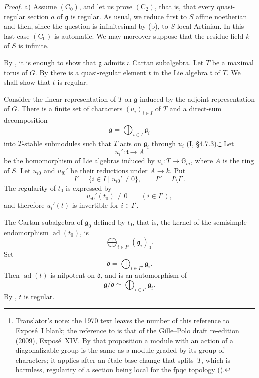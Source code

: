 \smallskip
\noindent
\emph{Proof.}
\textup{a)}
Assume \((\mathrm C_0)\), and let us prove \((\mathrm C_2)\), that
is, that every quasi-regular section \(a\) of \(\mathfrak g\) is
regular. As usual, we reduce first to \(S\) affine noetherian and
then, since the question is infinitesimal by \textup{(b)}, to
\(S\) local Artinian. In this last case \((\mathrm C_0)\) is
automatic. We may moreover suppose that the residue field \(k\)
of \(S\) is infinite.

By , it is enough to show that \(\mathfrak g\) admits a Cartan
subalgebra. Let \(T\) be a maximal torus of \(G\). By  there is
a quasi-regular element \(t\) in the Lie algebra \(\mathfrak t\)
of \(T\). We shall show that \(t\) is regular.

Consider the linear representation of \(T\) on \(\mathfrak g\)
induced by the adjoint representation of \(G\). There is a finite
set of characters \((u_i)_{i\in I}\) of \(T\) and a direct-sum
decomposition
\[
  \mathfrak g=\bigoplus_{i\in I}\mathfrak g_i
\]
into \(T\)-stable submodules such that \(T\) acts on
\(\mathfrak g_i\) through \(u_i\)
\textup{(I, \S4.7.3)}.\footnote{Translator's note: the 1970 text leaves the number of this reference to Exposé~I blank; the reference to  is that of the Gille--Polo draft re-edition (2009), Exposé~XIV. By that proposition a module with an action of a diagonalizable group is the same as a module graded by its group of characters; it applies after an étale base change that splits~\(T\), which is harmless, regularity of a section being local for the fpqc topology \textup{()}.} Let
\[
  u_i'\colon\mathfrak t\longrightarrow A
\]
be the homomorphism of Lie algebras induced by
\(u_i\colon T\to\mathbb G_m\), where \(A\) is the ring of \(S\).
Let \(u_{i0}\) and \(u_{i0}'\) be their reductions under
\(A\to k\). Put
\[
  I'=\{i\in I\mid u_{i0}'\ne0\},
  \qquad I''=I\setminus I'.
\]
The regularity of \(t_0\) is expressed by
\[
  u_{i0}'(t_0)\ne0\qquad(i\in I'),
\]
and therefore \(u_i'(t)\) is invertible for \(i\in I'\).

The Cartan subalgebra of \(\mathfrak g_0\) defined by \(t_0\), that
is, the kernel of the semisimple endomorphism
\(\operatorname{ad}(t_0)\), is
\[
  \bigoplus_{i\in I''}(\mathfrak g_i)_0.
\]
Set
\[
  \mathfrak d=\bigoplus_{i\in I''}\mathfrak g_i.
\]
Then \(\operatorname{ad}(t)\) is nilpotent on \(\mathfrak d\), and
is an automorphism of
\[
  \mathfrak g/\mathfrak d
  \simeq\bigoplus_{i\in I'}\mathfrak g_i.
\]
By , \(t\) is regular.


